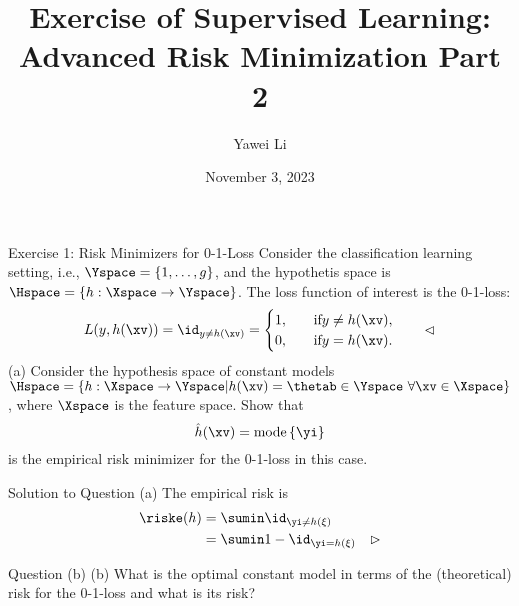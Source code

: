 \documentclass[aspectratio=169]{beamer}
\title[]{\textbf{Exercise of Supervised Learning: \\ Advanced Risk Minimization Part 2}}
\author{Yawei Li}
\institute[LMU]
{
\\
  \texttt{yawei.li@stat.uni-muenchen.de}
}
\date{November 3, 2023}
\begin{document}
\begin{frame}
\titlepage

\end{frame}


\begin{frame}{Exercise 1: Risk Minimizers for 0-1-Loss}
	Consider the classification learning setting, i.e., $\Yspace = \{1, \ldots, g\}$, and the hypothetis space is $\Hspace = \{h: \Xspace \rightarrow \Yspace \}$. The loss function of interest is the 0-1-loss:
	$$L(y, h(\xv)) = \id_{y \neq h(\xv)} = \begin{cases}
		1, \quad &\text{if} y \neq h(\xv), \\
		0, \quad &\text{if} y = h(\xv).
	\end{cases}
	\qquad \lhd
	$$
	(a) Consider the hypothesis space of constant models $\Hspace = \{h: \Xspace \rightarrow \Yspace | h(\xv) = \thetab \in \Yspace \ \forall \xv \in \Xspace \}$, where $\Xspace$ is the feature space. Show that 
	$$
		\hat{h}(\xv) = \mathrm{mode} \left\{\yi \right\}
	$$
	is the empirical risk minimizer for the 0-1-loss in this case.
\end{frame}

\begin{frame}{Solution to Question (a)}
\small
The empirical risk is
	\begin{align*}
		\riske(h) &= \sumin \id_{\yi \neq h(\xi)} \\
		&=\sumin 1 - \id_{\yi = h(\xi)} \quad \rhd \\
	\end{align*}
	
\end{frame}

\begin{frame}{Question (b)}
	(b) What is the optimal constant model in terms of the (theoretical) risk for the 0-1-loss and what is its risk?
	\vspace{10pt}
	
\end{frame}
\end{document}
